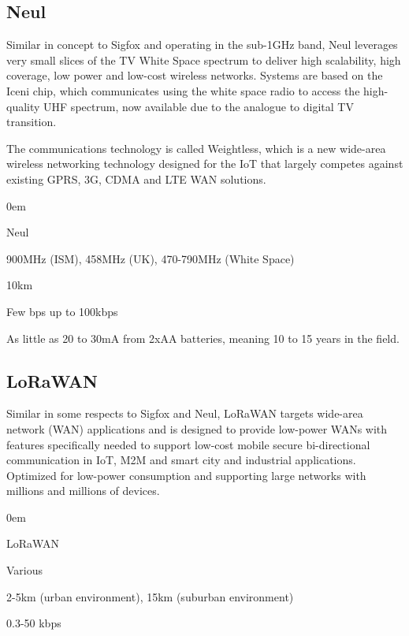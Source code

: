 \documentclass[11pt,a4paper,twoside]{article} %
\begin{document}
\subsection{Neul}
Similar in concept to Sigfox and operating in the sub-1GHz band, Neul leverages very small slices of the TV White Space spectrum to deliver high scalability, high coverage, low power and low-cost wireless networks. Systems are based on the Iceni chip, which communicates using the white space radio to access the high-quality UHF spectrum, now available due to the analogue to digital TV transition. 

The communications technology is called Weightless, which is a new wide-area wireless networking technology designed for the IoT that largely competes against existing GPRS, 3G, CDMA and LTE WAN solutions.
\vspace{-0.5cm}
\begin{description}
	\itemsep0em
	\item [Standard] Neul
	\item [Frequency] 900MHz (ISM), 458MHz (UK), 470-790MHz (White Space)
	\item [Range] 10km
	\item [Bitrate] Few bps up to 100kbps
	\item [Power Usage] As little as 20 to 30mA from 2xAA batteries, meaning 10 to 15 years in the field.
	\item [Infrastructure]
	\item [Network topology]
\end{description}


\subsection{LoRaWAN}
Similar in some respects to Sigfox and Neul, LoRaWAN targets wide-area network (WAN) applications and is designed to provide low-power WANs with features specifically needed to support low-cost mobile secure bi-directional communication in IoT, M2M and smart city and industrial applications. Optimized for low-power consumption and supporting large networks with millions and millions of devices.
\vspace{-0.5cm}
\begin{description}
	\itemsep0em
	\item [Standard] LoRaWAN
	\item [Frequency] Various
	\item [Range] 2-5km (urban environment), 15km (suburban environment)
	\item [Bitrate] 0.3-50 kbps
	\item [Power Usage]
	\item [Infrastructure]
	\item [Network topology]
\end{description}
\end{document}
